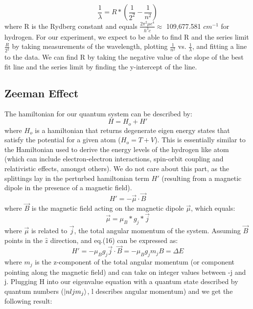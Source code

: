\documentclass{article}
\begin{document}
        \begin{equation}
            \frac{1}{\lambda} = R*(\frac{1}{2^2} - \frac{1}{n^2})
        \end{equation}
        where R is the Rydberg constant and equals $\frac{2\pi^2\mu e^4}{h^3c} \approx$ 109,677.581 $cm^{-1}$ for hydrogen. For our experiment, we expect to be able to find R and the series limit $\frac{R}{2^2}$ by taking measurements of the wavelength, plotting $\frac{1}{n^2}$ vs. $\frac{1}{\lambda}$, and fitting a line to the data. We can find R by taking the negative value of the slope of the best fit line and the series limit by finding the y-intercept of the line.  \cite{atm}
      
        
    \subsection{Zeeman Effect}
    The hamiltonian for our quantum system can be described by:
    \begin{equation}
        H = H_o + H'
    \end{equation}
    where $H_o$ is a hamiltonian that returns degenerate eigen energy states that satisfy the potential for a given atom ($H_o = T + V$). This is essentially similar to the Hamiltonian used to derive the energy levels of the hydrogen like atom (which can include electron-electron interactions, spin-orbit coupling and relativistic effects, amongst others). We do not care about this part, as the splittings lay in the perturbed hamiltonian term $H'$ (resulting from a magnetic dipole in the presence of a magnetic field).
    \begin{equation}
        H' = -\vec{\mu} \cdot \vec{B}
    \end{equation}
    where $\vec{B}$ is the magnetic field acting on the magnetic dipole $\vec{\mu}$, which equals:
    \begin{equation}
        \vec{\mu} = \mu_B * g_j * \vec{j}
    \end{equation}
    where $\vec{\mu}$ is related to $\vec{j}$, the total angular momentum of the system. Assuming $\vec{B}$ points in the $\hat{z}$ direction, and eq.(16) can be expressed as:
    \begin{equation}
        H' = -\mu_B g_j \vec{j} \cdot \vec{B} = -\mu_B g_j m_j B = \Delta E
    \end{equation}
    where $m_j$ is the z-component of the total angular momentum (or component pointing along the magnetic field) and can take on integer values between -j and j. Plugging H into our eigenvalue equation with a quantum state described by quantum numbers ($\ket{nljm_j}$, l describes angular momentum) and we get the following result:
\end{document}

